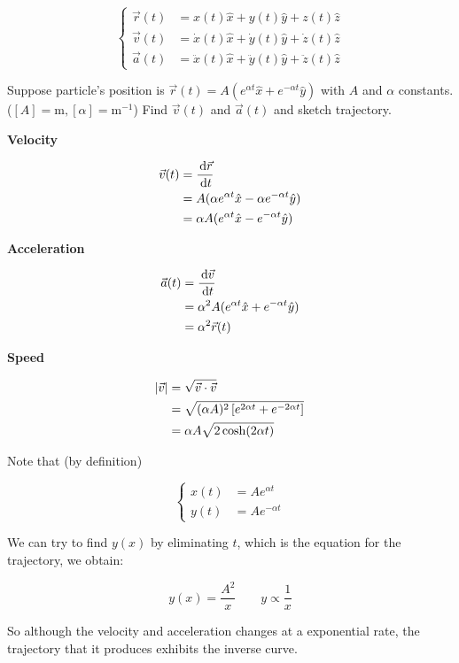 \begin{equation}
	\begin{cases}
		\vec r(t) &= x(t)\hat x + y(t)\hat y + z(t)\hat z\\
		\vec v(t) &= \dot x(t)\hat x + \dot y(t)\hat y + \dot z(t)\hat z\\
		\vec a(t) &= \ddot x(t)\hat x + \ddot y(t)\hat y + \ddot z(t)\hat z
	\end{cases}
\end{equation}

\begin{example}
	Suppose particle's position is $\vec r(t) = A(e^{\alpha t} \hat x + e^{-\alpha t} \hat y)$ with $A$ and $\alpha$ constants. ($[A] = \mathrm{m}, [\alpha] = \mathrm{m}^{-1}$) Find $\vec v(t)$ and $\vec a(t)$ and sketch trajectory.
\end{example}

\begin{sol}
	\textbf{Velocity}

	\begin{align}
		\vec v(t) &= \frac{\D \vec r}{\D t}\\
		&= A(\alpha e^{\alpha t} \hat x - \alpha e^{-\alpha t} \hat y)\\
		&= \alpha A(e^{\alpha t} \hat x - e^{-\alpha t} \hat y)
	\end{align}

	\textbf{Acceleration}

	\begin{align}
		\vec a(t) &= \frac{\D \vec v}{\D t}\\
		&= \alpha^2 A(e^{\alpha t} \hat x + e^{-\alpha t} \hat y)\\
		&= \alpha^2 \vec r(t)
	\end{align}

	\textbf{Speed}

	\begin{align}
		\abs{\vec v} &= \sqrt{\vec v \cdot \vec v}\\
		&= \sqrt{(\alpha A)^2 \left[e^{2\alpha t} + e^{-2\alpha t}\right]}\\
		&= \alpha A \sqrt{2\cosh(2\alpha t)}
	\end{align}

	Note that (by definition)

	\begin{equation}
		\begin{cases}
			x(t) &= Ae^{\alpha t}\\
			y(t) &= Ae^{-\alpha t}
		\end{cases}
	\end{equation}

	We can try to find $y(x)$ by eliminating $t$, which is the equation for the trajectory, we obtain:

	\begin{equation}
		y(x) = \frac{A^2}{x} \qquad y \propto \frac{1}{x}
	\end{equation}

	So although the velocity and acceleration changes at a exponential rate, the trajectory that it produces exhibits the inverse curve.
\end{sol}

